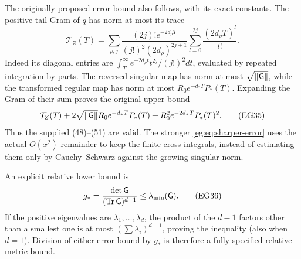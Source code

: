 The originally proposed error bound also follows, with its exact
constants. The positive tail Gram of $q$ has norm at most its trace
\[
 \mathcal T_Z(T)=\sum_{\rho,j}
 \frac{(2j)!e^{-2d_\rho T}}{(j!)^2(2d_\rho)^{2j+1}}
              \sum_{l=0}^{2j}\frac{(2d_\rho T)^l}{l!}.
 \tag{EG34}\label{eg:eq:old-tail}
\]
Indeed its diagonal entries are
$\int_T^\infty e^{-2d_\rho t}t^{2j}/(j!)^2dt$, evaluated by repeated
integration by parts. The reversed singular map has norm at most
$\sqrt{\|\mathsf G\|}$, while the transformed regular map has norm at most
$R_0e^{-d_*T}P_*(T)$. Expanding the Gram of their sum proves the
original upper bound
\[
 \mathcal T_Z(T)+2\sqrt{\|\mathsf G\|}R_0e^{-d_*T}P_*(T)
                      +R_0^2e^{-2d_*T}P_*(T)^2.
 \tag{EG35}\label{eg:eq:old-error}
\]
Thus the supplied (48)--(51) are valid. The stronger
\eqref{eg:eq:sharper-error} uses the actual $O(x^2)$ remainder to keep
the finite cross integrals, instead of estimating them only by
Cauchy--Schwarz against the growing singular norm.

An explicit relative lower bound is
\[
 g_* =\frac{\det\mathsf G}{(\operatorname{Tr}\mathsf G)^{d-1}}\le\lambda_{\min}(\mathsf G).
 \tag{EG36}\label{eg:eq:gstar}
\]
If the positive eigenvalues are $\lambda_1,\ldots,\lambda_d$, the
product of the $d-1$ factors other than a smallest one is at most
$(\sum\lambda_i)^{d-1}$, proving the inequality (also when $d=1$).
Division of either error bound by $g_*$ is therefore a fully
specified relative metric bound.


